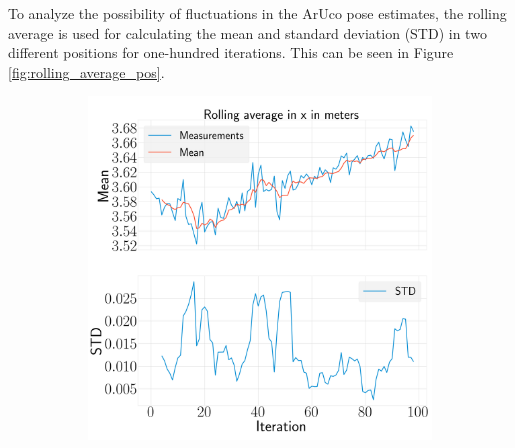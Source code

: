 \documentclass[../Head/report.tex]{subfiles}
\begin{document}
To analyze the possibility of fluctuations in the ArUco pose estimates, the rolling average is used for calculating the mean and standard deviation (STD) in two different positions for one-hundred iterations. This can be seen in Figure \ref{fig:rolling_average_pos}. 

\begin{figure}[H]
    \centering
    \begin{subfigure}[t]{.30\textwidth}
        \centering
        \includegraphics[width=\textwidth]{../Figures/analyse_rolling_average/test1/Calculated_rolling_average_in_x_with_mean_and_STD.png}
        \caption{}
        \label{fig:rolling_average_in_x_test1}
    \end{subfigure}
     \hspace{0.2em}
    \begin{subfigure}[t]{.30\textwidth}
        \centering

\end{subfigure}
\end{figure}
\end{document}
